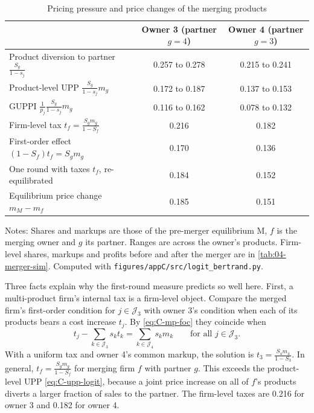 \begin{table}[htbp]
\centering
\caption{Pricing pressure and price changes of the merging products}
\label{tab:C-logit-merger}
\footnotesize
\begin{tabular}{@{}lcc@{}}
\toprule
 & Owner 3 (partner $g = 4$) & Owner 4 (partner $g = 3$) \\
\midrule
Product diversion to partner $\frac{S_g}{1 - s_j}$ & 0.257 to 0.278 & 0.215 to 0.241 \\
Product-level UPP $\frac{S_g}{1 - s_j}m_g$ & 0.172 to 0.187 & 0.137 to 0.153 \\
GUPPI $\frac{1}{p_j}\frac{S_g}{1 - s_j}m_g$ & 0.116 to 0.162 & 0.078 to 0.132 \\
Firm-level tax $t_f = \frac{S_gm_g}{1 - S_f}$ & 0.216 & 0.182 \\
First-order effect $(1 - S_f)t_f = S_gm_g$ & 0.170 & 0.136 \\
One round with taxes $t_f$, re-equilibrated & 0.184 & 0.152 \\
Equilibrium price change $m_M - m_f$ & 0.185 & 0.151 \\
\bottomrule
\end{tabular}

\vspace{3pt}
\begin{minipage}{0.97\textwidth}
\footnotesize Notes: Shares and markups are those of the pre-merger equilibrium M, $f$ is the merging owner and $g$
its partner. Ranges are across the owner's products. Firm-level shares, markups and profits before and after the
merger are in \cref{tab:04-merger-sim}. Computed with \texttt{figures/appC/src/logit\_bertrand.py}.
\end{minipage}
\end{table}

Three facts explain why the first-round measure predicts so well here. First, a multi-product firm's internal tax is
a firm-level object. Compare the merged firm's first-order condition for $j \in \mathcal{J}_3$ with owner 3's condition
when each of its products bears a cost increase $t_j$. By \eqref{eq:C-mp-foc} they coincide when
\begin{equation*}
  t_j - \sum_{k \in \mathcal{J}_3}s_kt_k = \sum_{k \in \mathcal{J}_4}s_km_k \qquad \text{for all } j \in \mathcal{J}_3 .
\end{equation*}
With a uniform tax and owner 4's common markup, the solution is $t_3 = \frac{S_4m_4}{1 - S_3}$. In general,
$t_f = \frac{S_gm_g}{1 - S_f}$ for merging firm $f$ with partner $g$. This exceeds the product-level UPP
\eqref{eq:C-upp-logit}, because a joint price increase on all of $f$'s products diverts a larger fraction of sales to
the partner. The firm-level taxes are 0.216 for owner 3 and 0.182 for owner 4.

